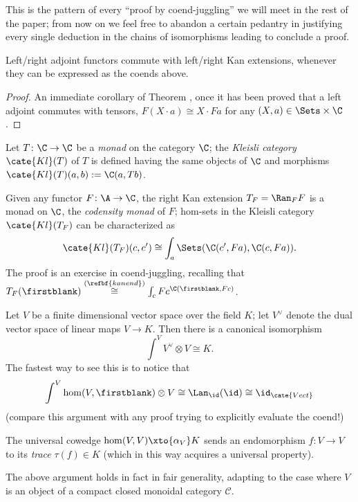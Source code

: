 \begin{remark}
This is the pattern of every ``proof by coend-juggling'' we will meet in the rest of the paper; from now on we feel free to abandon a certain pedantry in justifying every single deduction in the chains of isomorphisms leading to conclude a proof.
\end{remark}
\begin{proposition}
Left/right adjoint functors commute with left/right Kan extensions, whenever they can be expressed as the coends above.
\end{proposition}
\begin{proof}
An immediate corollary of Theorem , once it has been proved that a left adjoint commutes with tensors, \ie $F(X\cdot a)\cong X\cdot Fa$ for any $(X,a)\in \Sets\times \C$.
\end{proof}
\begin{example}
Let $T\colon \C\to \C$ be a \emph{monad} on the category $\C$; the \emph{Kleisli category} $\cate{Kl}(T)$ of $T$ is defined having the same objects of $\C$ and morphisms $\cate{Kl}(T)(a,b) := \C(a, Tb)$.

Given any functor $F\colon \A\to \C$, the right Kan extension $T_F=\Ran_FF$ is a monad on $\C$, the \emph{codensity monad} of $F$; hom-sets in the Kleisli category $\cate{Kl}(T_F)$ can be characterized as 
\[
\cate{Kl}(T_F)(c,c') \cong \int_a \Sets(\C(c', Fa), \C(c, Fa)).
\]
The proof is an exercise in coend-juggling, recalling that $T_F(\firstblank) \overset{(\refbf{kanend})}\cong \int_c Fc^{\C(\firstblank, Fc)}$.
\end{example}
\begin{example}\label{dualvecspace}
Let $V$ be a finite dimensional vector space over the field $K$; let $V^\lor$ denote the dual vector space of linear maps $V\to K$. Then there is a canonical isomorphism
\[
\int^V V^\lor \otimes V\cong K.
\]
The fastest way to see this is to notice that
\[
\int^V \hom(V,\firstblank)\otimes V\cong \Lan_{\id}(\id)\cong \id_{\cate{Vect}}
\]
(compare this argument with any proof trying to explicitly evaluate the coend!)
\end{example}
\begin{remark}
The universal cowedge $\hom(V,V)\xto{\alpha_V} K$ sends an endomorphism $f\colon V\to V$ to its \emph{trace} $\tau(f)\in K$ (which in this way acquires a universal property).

The above argument holds in fact in fair generality, adapting to the case where $V$ is an object of a compact closed monoidal category $\mathcal{C}$.
\end{remark}
